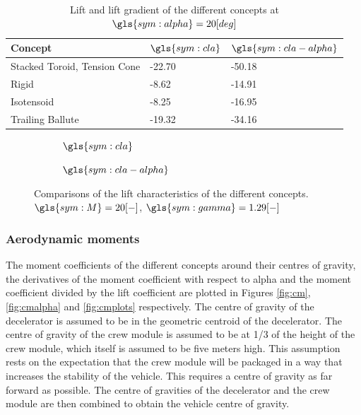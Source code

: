 \begin{table}[H]
	\caption{Lift and lift gradient of the different concepts at $\gls{sym:alpha}=20 [deg]$}%
	\label{tab:lift}%
	\begin{tabular}{|p{}|p{}|p{}|}
		\hline
		Concept  					& $\gls{sym:cla}$	& $\gls{sym:cla-alpha}$	\\ \hline \hline
		Stacked Toroid, Tension Cone	& -22.70     		& -50.18				\\ \hline
		Rigid  							& -8.62				& -14.91				\\ \hline
		Isotensoid  					& -8.25				& -16.95				\\ \hline
		Trailing Ballute				& -19.32			& -34.16				\\ \hline				
	\end{tabular}
\end{table}

\begin{figure}[h]
	\centering
	\begin{subfigure}[b]{0.49\textwidth}
		\setlength{} 
		\setlength{}
		
		\caption{$\gls{sym:cla}$}
		\label{fig:cl}
	\end{subfigure}
	\begin{subfigure}[b]{0.49\textwidth}
		\setlength{} 
		\setlength{}
		
		\caption{$\gls{sym:cla-alpha}$}
		\label{fig:claplha}
	\end{subfigure}
	\caption{Comparisons of the lift characteristics of the different concepts. $\gls{sym:M}=20[-]$, $\gls{sym:gamma}=1.29[-]$}
	\label{fig:clplots}
\end{figure}



\subsubsection{Aerodynamic moments}
The moment coefficients of the different concepts around their centres of gravity, the derivatives of the moment coefficient with respect to alpha and the moment coefficient divided by the lift coefficient are plotted in Figures \ref{fig:cm}, \ref{fig:cmalpha} and \ref{fig:cmplots} respectively. The centre of gravity of the decelerator is assumed to be in the geometric centroid of the decelerator. The centre of gravity of the crew module is assumed to be at 1/3 of the height of the crew module, which itself is assumed to be five meters high. This assumption rests on the expectation that the crew module will be packaged in a way that increases the stability of the vehicle. This requires a centre of gravity as far forward as possible. The centre of gravities of the decelerator and the crew module are then combined to obtain the vehicle centre of gravity. 

